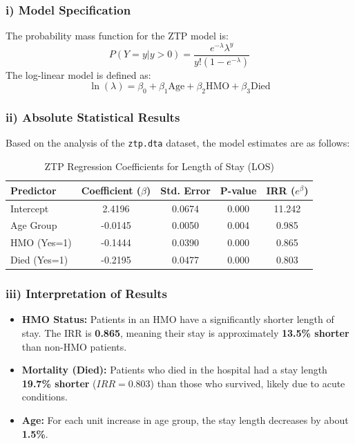 \documentclass[12pt]{article}
\begin{document}
\subsubsection{i) Model Specification}
The probability mass function for the ZTP model is:
\[ P(Y=y | y > 0) = \frac{e^{-\lambda} \lambda^y}{y! (1 - e^{-\lambda})} \]
The log-linear model is defined as:
\[ \ln(\lambda) = \beta_0 + \beta_1 \text{Age} + \beta_2 \text{HMO} + \beta_3 \text{Died} \]

\subsubsection{ii) Absolute Statistical Results}
Based on the analysis of the \texttt{ztp.dta} dataset, the model estimates are as follows:

\begin{table}[h!]
\centering
\caption{ZTP Regression Coefficients for Length of Stay (LOS)}
\begin{tabular}{@{}lcccc@{}}
\toprule
Predictor & Coefficient ($\beta$) & Std. Error & P-value & IRR ($e^\beta$) \\ \midrule
Intercept & 2.4196 & 0.0674 & 0.000 & 11.242 \\
Age Group & -0.0145 & 0.0050 & 0.004 & 0.985 \\
HMO (Yes=1) & -0.1444 & 0.0390 & 0.000 & 0.865 \\
Died (Yes=1) & -0.2195 & 0.0477 & 0.000 & 0.803 \\ \bottomrule
\end{tabular}
\end{table}

\subsubsection{iii) Interpretation of Results}
\begin{itemize}
    \item \textbf{HMO Status:} Patients in an HMO have a significantly shorter length of stay. The IRR is \textbf{0.865}, meaning their stay is approximately \textbf{13.5\% shorter} than non-HMO patients.
    \item \textbf{Mortality (Died):} Patients who died in the hospital had a stay length \textbf{19.7\% shorter} ($IRR = 0.803$) than those who survived, likely due to acute conditions.
    \item \textbf{Age:} For each unit increase in age group, the stay length decreases by about \textbf{1.5\%}.
\end{itemize}
\end{document}
